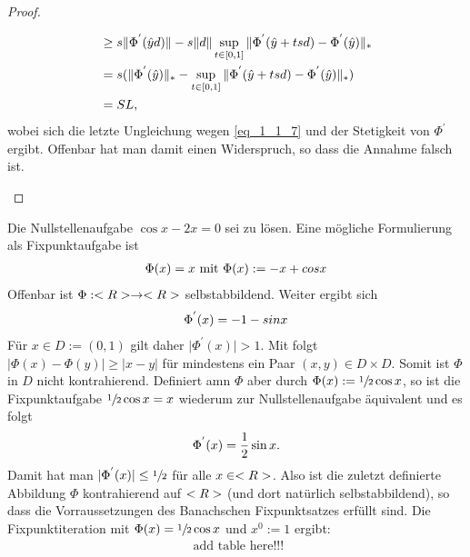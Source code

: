 \begin{proof}
\begin{enumerate}
\begin{align}
			&\ge s\Vert \Phi^{'}(\hat{y}d)\Vert - s\Vert d\Vert \sup_{t \in [0,1]}\Vert\Phi^{'}(\hat{y} + tsd) - \Phi^{'}(\hat{y})\Vert_{\ast} \notag \\
			&= s (\Vert \Phi^{'}(\hat{y}) \Vert_{\ast} - \sup_{t \in [0,1]}\Vert\Phi^{'}(\hat{y} + tsd) - \Phi^{'}(\hat{y})\Vert_{\ast}) \notag\\
			&= SL, \notag
		\end{align}
		wobei sich die letzte Ungleichung wegen \ref{eq_1_1_7} und der Stetigkeit von $\Phi^{'}$ ergibt. Offenbar hat man damit einen Widerspruch, so dass die Annahme falsch ist.
	\end{enumerate}
\end{proof}

\begin{example}
	Die Nullstellenaufgabe $\cos x - 2x = 0$ sei zu lösen. Eine mögliche Formulierung als Fixpunktaufgabe ist
	\begin{align}
		\Phi(x) = x \text{   mit  } \Phi(x) := -x + cos x \notag
	\end{align}
	Offenbar ist $\Phi: <R> \to <R>$ selbstabbildend. Weiter ergibt sich
	\begin{align}
		\Phi^{'}(x) = -1 - sin x \notag
	\end{align}
	Für $x \in D := (0,1)$ gilt daher $\vert \Phi^{'} (x)\vert > 1$. Mit  folgt $\vert \Phi(x) - \Phi(y)\vert \ge \vert x-y\vert$ für mindestens ein Paar $(x,y) \in D \times D$. Somit ist $\Phi$ in $D$ nicht kontrahierend.
	Definiert amn $\Phi$ aber durch $\Phi(x) := \sfrac{1}{2}\cos x$, so ist die Fixpunktaufgabe $\sfrac{1}{2}\cos x = x$ wiederum zur Nullstellenaufgabe äquivalent und es folgt
	\begin{align}
		\Phi^{'}(x) = \frac{1}{2}\sin x. \notag
	\end{align} 
	Damit hat man $\vert \Phi^{'}(x)\vert \le \sfrac{1}{2}$ für alle $x \in <R>$. Also ist die zuletzt definierte Abbildung $\Phi$ kontrahierend auf $<R>$ (und dort natürlich selbstabbildend), so dass die Vorraussetzungen des Banachschen Fixpunktsatzes erfüllt sind. Die Fixpunktiteration mit $\Phi(x) = \sfrac{1}{2}\cos x$ und $x^0 := 1$ ergibt:
	\begin{align}
	\text{ add table here!!!}
	\end{align}
\end{example}

